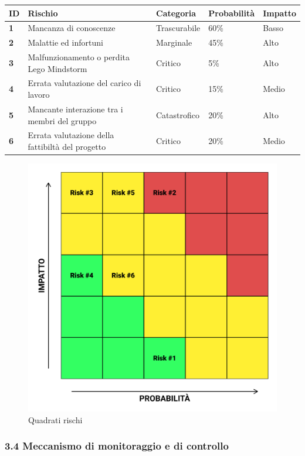\documentclass[]{article}
\begin{document}
\begin{longtable}[]{@{}lllll@{}}
\toprule
ID & Rischio & Categoria & Probabilità & Impatto\tabularnewline
\midrule
\endhead
\textbf{1} & Mancanza di conoscenze & Trascurabile & 60\% &
Basso\tabularnewline
\textbf{2} & Malattie ed infortuni & Marginale & 45\% &
Alto\tabularnewline
\textbf{3} & Malfunzionamento o perdita Lego Mindstorm & Critico & 5\% &
Alto\tabularnewline
\textbf{4} & Errata valutazione del carico di lavoro & Critico & 15\% &
Medio\tabularnewline
\textbf{5} & Mancante interazione tra i membri del gruppo & Catastrofico
& 20\% & Alto\tabularnewline
\textbf{6} & Errata valutazione della fattibiltà del progetto & Critico
& 20\% & Medio\tabularnewline
\bottomrule
\end{longtable}

\begin{figure}
\centering
\includegraphics{./Quadrati rischi.svg}
\caption{Quadrati rischi}
\end{figure}

\hypertarget{meccanismo-di-monitoraggio-e-di-controllo}{%
\subsubsection{3.4 Meccanismo di monitoraggio e di
controllo}\label{meccanismo-di-monitoraggio-e-di-controllo}}
\end{document}
